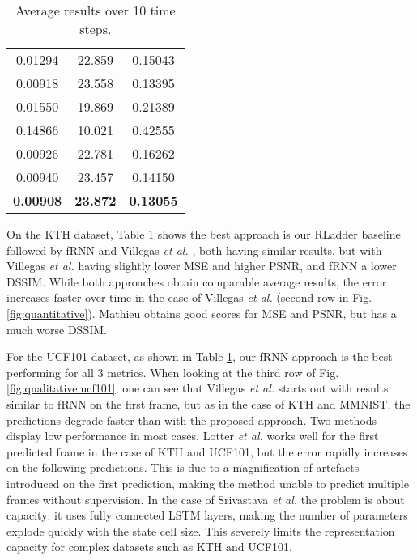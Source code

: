 \documentclass[runningheads]{llncs}
\begin{document}
\begin{table}[t!]
{\begin{tabular}{|c|c|c|}
        0.01294 & 22.859 & 0.15043 \\ \cline{1-3}
        0.00918 & 23.558 & 0.13395 \\ \cline{1-3}
0.01550 & 19.869 & 0.21389 \\ \cline{1-3}
        0.14866 & 10.021 & 0.42555 \\ \cline{1-3}
0.00926 & 22.781 & 0.16262 \\ \cline{1-3}
        0.00940 & 23.457 & 0.14150 \\ \cline{1-3}
        \textbf{0.00908} & \textbf{23.872} & \textbf{0.13055} \\ \cline{1-3}
    \end{tabular}}
    \caption{Average results over 10 time steps.}
    \vspace{-0.7cm}
    \label{tab:results}
\end{table}

On the KTH dataset, Table \ref{tab:results} shows the best approach is our RLadder baseline followed by fRNN and Villegas \emph{et al.} \cite{villegas2017decomposing}, both having similar results, but with Villegas \emph{et al.} having slightly lower MSE and higher PSNR, and fRNN a lower DSSIM. While both approaches obtain comparable average results, the error increases faster over time in the case of Villegas \emph{et al.} (second row in Fig.\ref{fig:quantitative}). Mathieu obtains good scores for MSE and PSNR, but has a much worse DSSIM.

For the UCF101 dataset, as shown in Table \ref{tab:results}, our fRNN approach is the best performing for all 3 metrics. When looking at the third row of Fig. \ref{fig:qualitative:ucf101}, one can see that Villegas \emph{et al.} starts out with results similar to fRNN on the first frame, but as in the case of KTH and MMNIST, the predictions degrade faster than with the proposed approach. Two methods display low performance in most cases. Lotter \emph{et al.} works well for the first predicted frame in the case of KTH and UCF101, but the error rapidly increases on the following predictions. This is due to a magnification of artefacts introduced on the first prediction, making the method unable to predict multiple frames without supervision. In the case of Srivastava \emph{et al.} the problem is about capacity: it uses fully connected LSTM layers, making the number of parameters explode quickly with the state cell size. This severely limits the representation capacity for complex datasets such as KTH and UCF101.
\end{document}
